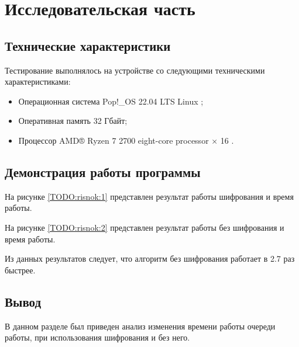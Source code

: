 \section{\large Исследовательская часть}

\subsection{Технические характеристики}

Тестирование выполнялось на устройстве со следующими техническими характеристиками:

\begin{itemize}
	\item Операционная система Pop!\_OS 22.04 LTS \cite{ubuntu} Linux \cite{linux};
	\item Оперативная память 32 Гбайт;
	\item Процессор AMD® Ryzen 7 2700 eight-core processor × 16 \cite{amd}.
\end{itemize}

\subsection{Демонстрация работы программы}

На рисунке \ref{TODO:risnok:1} представлен результат работы шифрования и время работы.

\begin{figure}[ht!]
\end{figure}

На рисунке \ref{TODO:risnok:2} представлен результат работы без шифрования и время работы.


\begin{figure}[ht!]
\end{figure}


Из данных результатов следует, что алгоритм без шифрования работает в 2.7 раз быстрее.

\subsection{Вывод}

В данном разделе был приведен анализ изменения времени работы очереди работы, 
при использования шифрования и без него.
